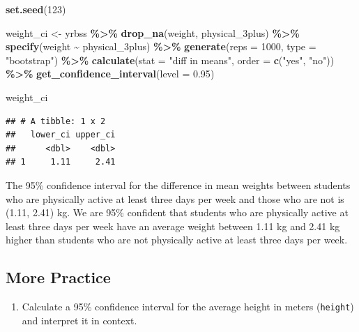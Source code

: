 \documentclass[
]{article}
\newenvironment{Shaded}{\begin{snugshade}}{\end{snugshade}}
\newcommand{\AttributeTok}[1]{\textcolor[rgb]{0.13,0.29,0.53}{#1}}
\newcommand{\DecValTok}[1]{\textcolor[rgb]{0.00,0.00,0.81}{#1}}
\newcommand{\FloatTok}[1]{\textcolor[rgb]{0.00,0.00,0.81}{#1}}
\newcommand{\FunctionTok}[1]{\textcolor[rgb]{0.13,0.29,0.53}{\textbf{#1}}}
\newcommand{\NormalTok}[1]{#1}
\newcommand{\OtherTok}[1]{\textcolor[rgb]{0.56,0.35,0.01}{#1}}
\newcommand{\SpecialCharTok}[1]{\textcolor[rgb]{0.81,0.36,0.00}{\textbf{#1}}}
\newcommand{\StringTok}[1]{\textcolor[rgb]{0.31,0.60,0.02}{#1}}
\providecommand{\tightlist}{%
  \setlength{\itemsep}{0pt}\setlength{\parskip}{0pt}}
\begin{document}
\begin{Shaded}
\begin{Highlighting}[]
\FunctionTok{set.seed}\NormalTok{(}\DecValTok{123}\NormalTok{)}

\NormalTok{weight\_ci }\OtherTok{\textless{}{-}}\NormalTok{ yrbss }\SpecialCharTok{\%\textgreater{}\%}
  \FunctionTok{drop\_na}\NormalTok{(weight, physical\_3plus) }\SpecialCharTok{\%\textgreater{}\%}
  \FunctionTok{specify}\NormalTok{(weight }\SpecialCharTok{\textasciitilde{}}\NormalTok{ physical\_3plus) }\SpecialCharTok{\%\textgreater{}\%}
  \FunctionTok{generate}\NormalTok{(}\AttributeTok{reps =} \DecValTok{1000}\NormalTok{, }\AttributeTok{type =} \StringTok{"bootstrap"}\NormalTok{) }\SpecialCharTok{\%\textgreater{}\%}
  \FunctionTok{calculate}\NormalTok{(}\AttributeTok{stat =} \StringTok{"diff in means"}\NormalTok{, }\AttributeTok{order =} \FunctionTok{c}\NormalTok{(}\StringTok{"yes"}\NormalTok{, }\StringTok{"no"}\NormalTok{)) }\SpecialCharTok{\%\textgreater{}\%}
  \FunctionTok{get\_confidence\_interval}\NormalTok{(}\AttributeTok{level =} \FloatTok{0.95}\NormalTok{)}

\NormalTok{weight\_ci}
\end{Highlighting}
\end{Shaded}

\begin{verbatim}
## # A tibble: 1 x 2
##   lower_ci upper_ci
##      <dbl>    <dbl>
## 1     1.11     2.41
\end{verbatim}

The 95\% confidence interval for the difference in mean weights between
students who are physically active at least three days per week and
those who are not is (1.11, 2.41) kg. We are 95\% confident that
students who are physically active at least three days per week have an
average weight between 1.11 kg and 2.41 kg higher than students who are
not physically active at least three days per week.

\subsection{More Practice}\label{more-practice}

\begin{enumerate}
\def\labelenumi{\arabic{enumi}.}
\setcounter{enumi}{7}
\tightlist
\item
  Calculate a 95\% confidence interval for the average height in meters
  (\texttt{height}) and interpret it in context.
\end{enumerate}
\end{document}
